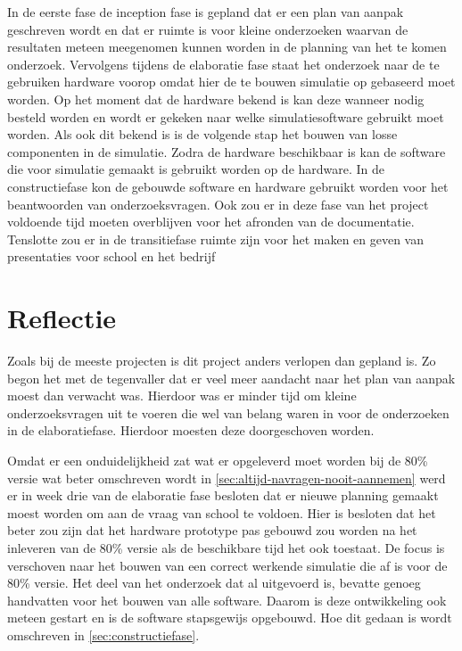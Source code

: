 \documentclass[a4paper, 11pt, oneside]{report}
\begin{document}
In de eerste fase de inception fase is gepland dat er een plan van aanpak geschreven wordt en dat er ruimte is voor kleine onderzoeken waarvan de resultaten meteen meegenomen kunnen worden in de planning van het te komen onderzoek.
Vervolgens tijdens de elaboratie fase staat het onderzoek naar de te gebruiken hardware voorop omdat hier de te bouwen simulatie op gebaseerd moet worden.    
Op het moment dat de hardware bekend is kan deze wanneer nodig besteld worden en wordt er gekeken naar welke simulatiesoftware gebruikt moet worden.
Als ook dit bekend is is de volgende stap het bouwen van losse componenten in de simulatie. 
Zodra de hardware beschikbaar is kan de software die voor simulatie gemaakt is gebruikt worden op de hardware.
In de constructiefase kon de gebouwde software en hardware gebruikt worden voor het beantwoorden van onderzoeksvragen. 
Ook zou er in deze fase van het project voldoende tijd moeten overblijven voor het afronden van de documentatie.
Tenslotte zou er in de transitiefase ruimte zijn voor het maken en geven van presentaties voor school en het bedrijf
 
\section{Reflectie}\label{sec:reflectie}

Zoals bij de meeste projecten is dit project anders verlopen dan gepland is. Zo begon het met de tegenvaller dat er veel meer aandacht naar het plan van aanpak moest dan verwacht was. Hierdoor was er minder tijd om kleine onderzoeksvragen uit te voeren die wel van belang waren in voor de onderzoeken in de elaboratiefase. Hierdoor moesten deze doorgeschoven worden.

Omdat er een onduidelijkheid zat wat er opgeleverd moet worden bij de 80\% versie wat beter omschreven wordt in \autoref{sec:altijd-navragen-nooit-aannemen} werd er in week drie van de elaboratie fase besloten dat er nieuwe planning gemaakt moest worden om aan de vraag van school te voldoen. 
Hier is besloten dat het beter zou zijn dat het hardware prototype pas gebouwd zou worden na het inleveren van de 80\% versie als de beschikbare tijd het ook toestaat. 
De focus is verschoven naar het bouwen van een correct werkende simulatie die af is voor  de 80\% versie.
Het deel van het onderzoek dat al uitgevoerd is, bevatte genoeg handvatten voor het bouwen van alle software. 
Daarom is deze ontwikkeling ook meteen gestart en is de software stapsgewijs opgebouwd. Hoe dit gedaan is wordt omschreven in \autoref{sec:constructiefase}. 
\end{document}

